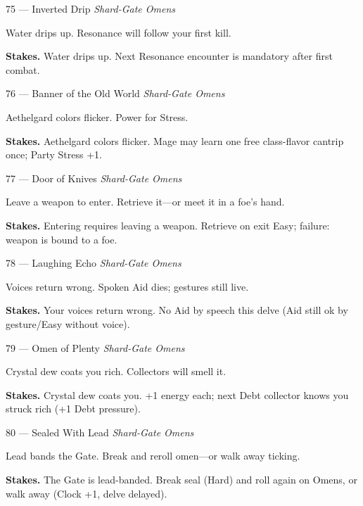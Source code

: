 \begin{encounterentry}{75 --- Inverted Drip}
\textit{Shard-Gate Omens}

Water drips up. Resonance will follow your first kill.

\textbf{Stakes.} Water drips up. Next Resonance encounter is mandatory after first combat.
\end{encounterentry}

\begin{encounterentry}{76 --- Banner of the Old World}
\textit{Shard-Gate Omens}

Aethelgard colors flicker. Power for Stress.

\textbf{Stakes.} Aethelgard colors flicker. Mage may learn one free class-flavor cantrip once; Party Stress +1.
\end{encounterentry}

\begin{encounterentry}{77 --- Door of Knives}
\textit{Shard-Gate Omens}

Leave a weapon to enter. Retrieve it---or meet it in a foe's hand.

\textbf{Stakes.} Entering requires leaving a weapon. Retrieve on exit Easy; failure: weapon is bound to a foe.
\end{encounterentry}

\begin{encounterentry}{78 --- Laughing Echo}
\textit{Shard-Gate Omens}

Voices return wrong. Spoken Aid dies; gestures still live.

\textbf{Stakes.} Your voices return wrong. No Aid by speech this delve (Aid still ok by gesture/Easy without voice).
\end{encounterentry}

\begin{encounterentry}{79 --- Omen of Plenty}
\textit{Shard-Gate Omens}

Crystal dew coats you rich. Collectors will smell it.

\textbf{Stakes.} Crystal dew coats you. +1 energy each; next Debt collector knows you struck rich (+1 Debt pressure).
\end{encounterentry}

\begin{encounterentry}{80 --- Sealed With Lead}
\textit{Shard-Gate Omens}

Lead bands the Gate. Break and reroll omen---or walk away ticking.

\textbf{Stakes.} The Gate is lead-banded. Break seal (Hard) and roll again on Omens, or walk away (Clock +1, delve delayed).
\end{encounterentry}

